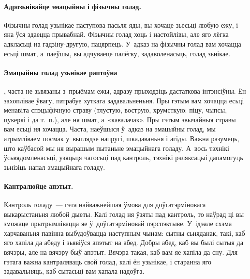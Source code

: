 \paragraph{Адрозьнівайце эмацыйны і фізычны голад.}
Фізычны голад узьнікае паступова пасьля яды, вы хочаце зьесьці любую ежу, і яна ўся здаецца прывабнай. Фізычны голад хоць і настойлівы, але яго лёгка адкласьці на гадзіну-другую, пацярпець. У~адказ на фізычны голад вам хочацца есьці шмат, а~паеўшы, вы адчуваеце палёгку, задаволенасьць, голад зьнікае.

\paragraph{Эмацыйны голад узьнікае раптоўна}, часта не зьвязаны з~прыёмам ежы, адразу прыходзіць дастаткова інтэнсіўны.
Ён захоплівае ўвагу, патрабуе хуткага задавальненьня. Пры гэтым вам хочацца есьці менавіта спэцыфічную страву (тлустую, вострую, хрумсткую: піцу, чыпсы, цукеркі і да т.~п.), але ня шмат, а~«кавалачак». Пры гэтым звычайныя стравы вам есьці ня хочацца. Часта, наеўшыся ў~адказ на эмацыйны голад, мы атрымліваем посмак у~выглядзе напругі, шкадаваньня і агіды. Важна разумець, што каўбасой мы ня вырашым пытаньне эмацыйнага голаду. А~вось тэхнікі ўсьвядомленасьці, узяцьця чагосьці пад кантроль, тэхнікі рэляксацыі дапамогуць зьнізіць напал эмацыйнага голаду.

\paragraph{Кантралюйце апэтыт.}
Кантроль голаду~--- гэта найважнейшая ўмова для доўгатэрміновага выкарыстаньня любой дыеты. Калі голад ня ўзяты пад кантроль, то наўрад ці вы зможаце прытрымлівацца яе ў~доўгатэрміновай пэрспэктыве. У~ідэале схэма харчаваньня павінна выбудоўвацца наступным чынам: сытны сьняданак, такі, каб яго хапіла да абеду і зьявіўся апэтыт на абед. Добры абед, каб вы былі сытыя да вячэры, але на вячэру быў апэтыт. Вячэра такая, каб вам яе хапіла да сну. Для гэтага важна кантраляваць свой голад, калі ён узьнікае, і старанна яго задавальняць, каб сытасьці вам хапала надоўга.

